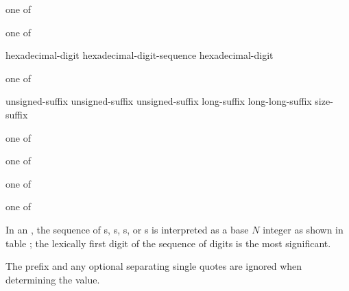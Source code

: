 \begin{bnf}
 \textnormal{one of}\br
\end{bnf}

\begin{bnf}
 \textnormal{one of}\br
\end{bnf}

\begin{bnf}
\br
    hexadecimal-digit\br
    hexadecimal-digit-sequence  hexadecimal-digit
\end{bnf}

\begin{bnf}
 \textnormal{one of}\br
    \br
    \br
\end{bnf}

\begin{bnf}
\br
    unsigned-suffix  \br
    unsigned-suffix  \br
    unsigned-suffix  \br
    long-suffix  \br
    long-long-suffix  \br
    size-suffix 
\end{bnf}

\begin{bnf}
 \textnormal{one of}\br
\end{bnf}

\begin{bnf}
 \textnormal{one of}\br
\end{bnf}

\begin{bnf}
 \textnormal{one of}\br
\end{bnf}

\begin{bnf}
 \textnormal{one of}\br
\end{bnf}

\pnum
{}%
%
%
In an ,
the sequence of
s,
s,
s, or
s
is interpreted as a base $N$ integer as shown in table ;
the lexically first digit of the sequence of digits is the most significant.
\begin{note}
The prefix and any optional separating single quotes are ignored
when determining the value.
\end{note}

